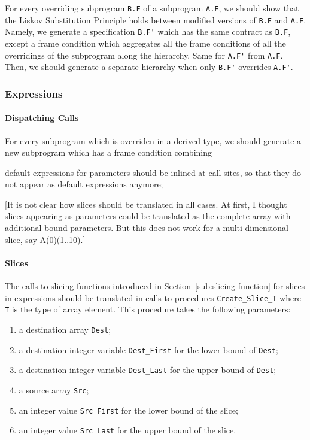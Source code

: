 \documentclass{article}
\begin{document}
For every overriding subprogram \verb|B.F| of a subprogram \verb|A.F|, we
should show that the Liskov Substitution Principle holds between modified
versions of \verb|B.F| and \verb|A.F|. Namely, we generate a specification
\verb|B.F'| which has the same contract as \verb|B.F|, except a frame condition
which aggregates all the frame conditions of all the overridings of the
subprogram along the hierarchy. Same for \verb|A.F'| from \verb|A.F|. Then, we
should generate a separate hierarchy when only \verb|B.F'| overrides
\verb|A.F'|.

\subsubsection{Expressions}

\paragraph{Dispatching Calls}

For every subprogram which is overriden in a derived type, we should generate a
new subprogram which has a frame condition combining 

default expressions for parameters should be inlined at call sites, so
  that they do not appear as default expressions anymore;

[It is not clear how slices should be translated in all cases. At first, I
thought slices appearing as parameters could be translated as the complete
array with additional bound parameters. But this does not work for a
multi-dimensional slice, say A(0)(1..10).]

\paragraph{Slices}

The calls to slicing functions introduced in Section~\ref{sub:slicing-function}
for slices in expressions should be translated in calls to procedures
\verb|Create_Slice_T| where \verb|T| is the type of array element. This
procedure takes the following parameters:
\begin{enumerate}
\item a destination array \verb|Dest|;
\item a destination integer variable \verb|Dest_First| for the lower bound of
  \verb|Dest|;
\item a destination integer variable \verb|Dest_Last| for the upper bound of
  \verb|Dest|;
\item a source array \verb|Src|;
\item an integer value \verb|Src_First| for the lower bound of the slice;
\item an integer value \verb|Src_Last| for the upper bound of the slice.
\end{enumerate}
\end{document}

